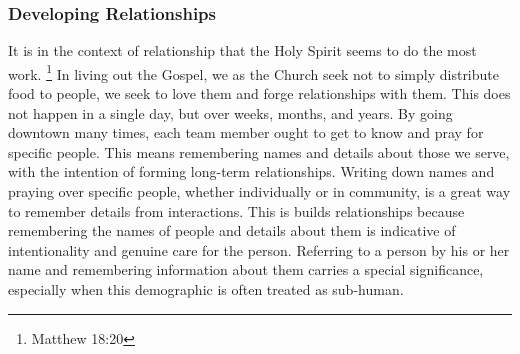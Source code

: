 \subsubsection{Developing Relationships}

    \qPiperCoronary
    It is in the context of relationship that the Holy Spirit seems to do the most work.
    \footnote{Matthew 18:20}
    In living out the Gospel, we as the Church seek not to simply distribute food to people, we seek to love them and forge relationships with them.
    This does not happen in a single day, but over weeks, months, and years.
    By going downtown many times, each team member ought to get to know and pray for specific people.
    This means remembering names and details about those we serve, with the intention of forming long-term relationships.
    Writing down names and praying over specific people, whether individually or in community, is a great way to remember details from interactions.
    This is builds relationships because remembering the names of people and details about them is indicative of intentionality and genuine care for the person.
    Referring to a person by his or her name and remembering information about them carries a special significance, especially when this demographic is often treated as sub-human.

